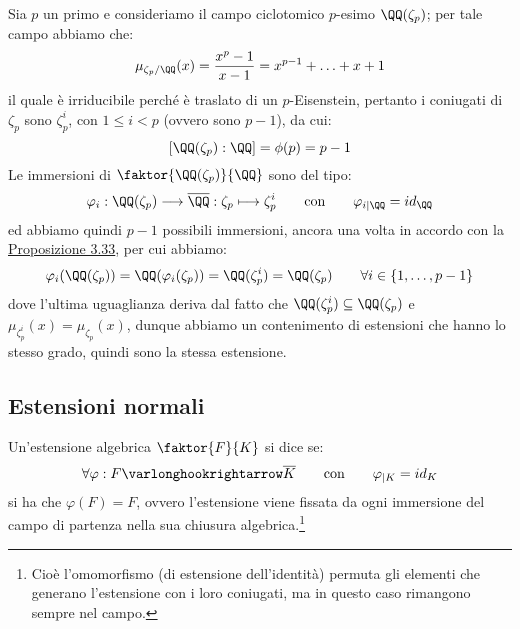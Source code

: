 \documentclass[11pt]{scrartcl}
\begin{document}
\begin{example}
    Sia $p$ un primo e consideriamo il campo ciclotomico $p$-esimo $\QQ(\zeta_p)$; per tale campo abbiamo che:
    \[ \mu_{\zeta_p/\QQ} (x) = \frac{x^p - 1}{x -1} = x^{p-1} + \ldots + x + 1
        \] 
    il quale è irriducibile perché è traslato di un $p$-Eisenstein, pertanto i coniugati di $\zeta_p$ sono $\zeta_p^i$, con $1 \leq i < p$ (ovvero sono $p-1$), da cui:
    \[ [\QQ(\zeta_p) : \QQ] = \phi(p) = p - 1 
        \]
    Le immersioni di $\faktor{\QQ(\zeta_p)}{\QQ}$ sono del tipo:
    \[ \varphi_i : \QQ(\zeta_p) \longrightarrow \overline \QQ : \zeta_p \longmapsto \zeta_p^i \qquad \text{con} \qquad \varphi_{i|\QQ} = id_\QQ
        \]
    ed abbiamo quindi $p - 1$ possibili immersioni, ancora una volta in accordo con la \hyperref[3.33]{Proposizione 3.33}, per cui abbiamo:
    \[ \varphi_i(\QQ(\zeta_p)) = \QQ(\varphi_i(\zeta_p)) = \QQ(\zeta_p^i) = \QQ(\zeta_p) \qquad \forall i \in \{1,\ldots,p-1\}
        \]
    dove l'ultima uguaglianza deriva dal fatto che $\QQ(\zeta_p^i) \subseteq \QQ(\zeta_p)$ e $\mu_{\zeta_p^i}(x) = \mu_{\zeta_p}(x)$, dunque abbiamo un contenimento di estensioni
    che hanno lo stesso grado, quindi sono la stessa estensione.
\end{example}

\newpage
\subsection{Estensioni normali}

\begin{definition}
    Un'estensione algebrica $\faktor{F}{K}$ si dice  se:
    \[ \forall \varphi : F \varlonghookrightarrow \overline K \qquad \text{con} \qquad \varphi_{|K} = id_K
        \]
    si ha che $\varphi(F) = F$, ovvero l'estensione viene fissata da ogni immersione del campo di partenza nella
    sua chiusura algebrica.\footnote{Cioè l'omomorfismo (di estensione dell'identità) permuta gli elementi che generano l'estensione con i loro coniugati, ma in questo caso rimangono sempre nel campo.}
\end{definition}
\end{document}

